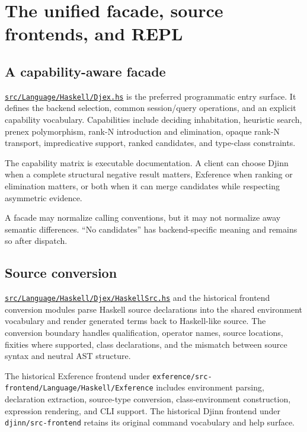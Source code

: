 \documentclass[10pt,letterpaper,oneside]{report}
\newcommand{\filepath}[1]{\nolinkurl{#1}}
\def\DjexBase{https://github.com/VladimirReshetnikov/Djex/blob/e454757d53ec057238c22fc6cd0d935b7d96b3dc/}
\newcommand{\dpath}[1]{\href{\DjexBase#1}{\nolinkurl{#1}}}
\begin{document}
\chapter{The unified facade, source frontends, and REPL}\label{ch:djex-facade}

\section{A capability-aware facade}

\dpath{src/Language/Haskell/Djex.hs} is the preferred programmatic entry surface. It defines the backend selection, common session/query operations, and an explicit capability vocabulary. Capabilities include deciding inhabitation, heuristic search, prenex polymorphism, rank-N introduction and elimination, opaque rank-N transport, impredicative support, ranked candidates, and type-class constraints.

The capability matrix is executable documentation. A client can choose Djinn when a complete structural negative result matters, Exference when ranking or elimination matters, or both when it can merge candidates while respecting asymmetric evidence.

\begin{invariantbox}
A facade may normalize calling conventions, but it may not normalize away semantic differences. ``No candidates'' has backend-specific meaning and remains so after dispatch.
\end{invariantbox}

\section{Source conversion}

\dpath{src/Language/Haskell/Djex/HaskellSrc.hs} and the historical frontend conversion modules parse Haskell source declarations into the shared environment vocabulary and render generated terms back to Haskell-like source. The conversion boundary handles qualification, operator names, source locations, fixities where supported, class declarations, and the mismatch between source syntax and neutral AST structure.

The historical Exference frontend under \filepath{exference/src-frontend/Language/Haskell/Exference} includes environment parsing, declaration extraction, source-type conversion, class-environment construction, expression rendering, and CLI support. The historical Djinn frontend under \filepath{djinn/src-frontend} retains its original command vocabulary and help surface.
\end{document}
